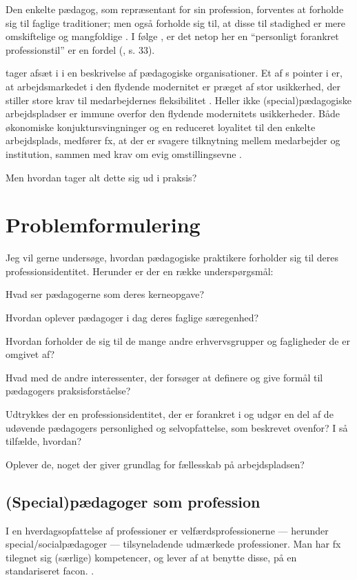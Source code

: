 Den enkelte pædagog, som repræsentant for sin profession, forventes at forholde sig til faglige traditioner; men også forholde sig til, at disse til stadighed er mere omskiftelige og mangfoldige \autocite[s.33]{hansbolKonstruktionAfProfessionel2008}. I følge \citeauthor{hansbolKonstruktionAfProfessionel2008}, er det netop her en “personligt forankret professionstil” er en fordel (\citeyear{hansbolKonstruktionAfProfessionel2008}, s. 33).

\citeauthor{kofodOrganisationOgLedelse2016} tager afsæt i \citeauthor{baumanLiquidModernity2000} i en beskrivelse af pædagogiske organisationer. 
Et af \citeauthor{baumanLiquidModernity2000}s pointer i  er, at arbejdsmarkedet i den flydende modernitet er præget af stor usikkerhed, der stiller store krav til medarbejdernes fleksibilitet \autocite[s. 147; 151]{baumanLiquidModernity2000}.
Heller ikke (special)pædagogiske arbejdspladser er immune overfor den flydende modernitets usikkerheder.
Både økonomiske konjuktursvingninger og en reduceret loyalitet til den enkelte arbejdsplads, medfører fx, at der er svagere tilknytning mellem medarbejder og institution, sammen med krav om evig omstillingsevne \autocite[s. 166f]{kofodOrganisationOgLedelse2016}.

Men hvordan tager alt dette sig ud i praksis?

\section{Problemformulering}
Jeg vil gerne undersøge, hvordan pædagogiske praktikere forholder sig til deres professionsidentitet.
Herunder er der en række underspørgsmål:

Hvad ser pædagogerne som deres kerneopgave?

Hvordan oplever pædagoger i dag deres faglige særegenhed?

Hvordan forholder de sig til de mange andre erhvervsgrupper og fagligheder de er omgivet af?

Hvad med de andre interessenter, der forsøger at definere og give formål til pædagogers praksisforståelse?

Udtrykkes der en professionsidentitet, der er forankret i og udgør en del af de udøvende pædagogers personlighed og selvopfattelse, som beskrevet ovenfor?
I så tilfælde, hvordan?

Oplever de, noget der giver grundlag for fællesskab på arbejdspladsen?

\subsection{(Special)pædagoger som profession}
I en hverdagsopfattelse af professioner er velfærdsprofessionerne — herunder special/socialpædagoger — tilsyneladende udmærkede professioner.
Man har fx tilegnet sig (særlige) kompetencer, og lever af at benytte disse, på en standariseret facon. \autocite[ss. 443-445]{frederiksenVelfaerdsprofessionerMellemOmsorg2017}.

